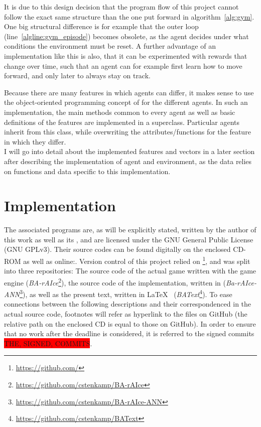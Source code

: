 It is due to this design decision that the program flow of this project cannot follow the exact same structure than the one put forward in algorithm~\ref{alg:gym}. One big structural difference is for example that the outer loop (line~\ref{algline:gym_episode}) becomes obsolete, as the agent decides under what conditions the environment must be reset. A further advantage of an implementation like this is also, that it can be experimented with rewards that change over time, such that an agent can for example first learn how to move forward, and only later to always stay on track.

Because there are many features in which agents can differ, it makes sense to use the object-oriented programming concept of  for the different agents. In such an implementation, the main methods common to every agent as well as basic definitions of the features are implemented in a superclass. Particular agents inherit from this class, while overwriting the attributes/functions for the feature in which they differ.\\

\noindent I will go into detail about the implemented features and vectors in a later section after describing the implementation of agent and environment, as the data relies on functions and data specific to this implementation. 


\section{Implementation}

\label{ch:implementation}

The associated programs are, as will be explicitly stated, written by the author of this work as well as its \leonbase, and are licensed under the GNU General Public License (GNU GPLv3). Their source codes can be found digitally on the enclosed CD-ROM as well as online:. Version control of this project relied on \footnote{\url{https://github.com/}}, and was split into three repositories: The source code of the actual game written with the game engine  (\textit{BA-rAIce}\footnote{\url{https://github.com/cstenkamp/BA-rAIce}}), the source code of the implementation, written in  (\textit{Ba-rAIce-ANN}\footnote{\url{https://github.com/cstenkamp/BA-rAIce-ANN}}), as well as the present text, written in \LaTeX ~ (\textit{BAText}\footnote{\url{https://github.com/cstenkamp/BAText}}). To ease connections between the following descriptions and their correspondenced in the actual source code, footnotes will refer as hyperlink to the files on GitHub (the relative path on the enclosed CD is equal to those on GitHub). In order to ensure that no work after the deadline is considered, it is referred to the signed commits \colorbox{red}{THE, SIGNED, COMMITS}.

